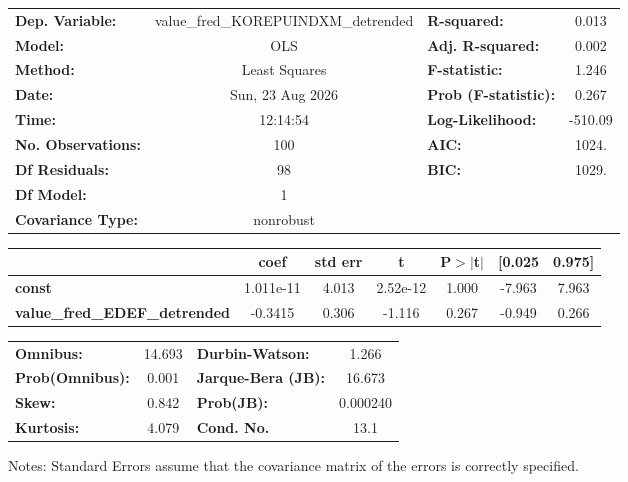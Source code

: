 \begin{center}
\begin{tabular}{lclc}
\toprule
\textbf{Dep. Variable:}               & value\_fred\_KOREPUINDXM\_detrended & \textbf{  R-squared:         } &     0.013   \\
\textbf{Model:}                       &                 OLS                 & \textbf{  Adj. R-squared:    } &     0.002   \\
\textbf{Method:}                      &            Least Squares            & \textbf{  F-statistic:       } &     1.246   \\
\textbf{Date:}                        &           Sun, 23 Aug 2026          & \textbf{  Prob (F-statistic):} &    0.267    \\
\textbf{Time:}                        &               12:14:54              & \textbf{  Log-Likelihood:    } &   -510.09   \\
\textbf{No. Observations:}            &                   100               & \textbf{  AIC:               } &     1024.   \\
\textbf{Df Residuals:}                &                    98               & \textbf{  BIC:               } &     1029.   \\
\textbf{Df Model:}                    &                     1               & \textbf{                     } &             \\
\textbf{Covariance Type:}             &              nonrobust              & \textbf{                     } &             \\
\bottomrule
\end{tabular}
\begin{tabular}{lcccccc}
                                      & \textbf{coef} & \textbf{std err} & \textbf{t} & \textbf{P$> |$t$|$} & \textbf{[0.025} & \textbf{0.975]}  \\
\midrule
\textbf{const}                        &    1.011e-11  &        4.013     &  2.52e-12  &         1.000        &       -7.963    &        7.963     \\
\textbf{value\_fred\_EDEF\_detrended} &      -0.3415  &        0.306     &    -1.116  &         0.267        &       -0.949    &        0.266     \\
\bottomrule
\end{tabular}
\begin{tabular}{lclc}
\textbf{Omnibus:}       & 14.693 & \textbf{  Durbin-Watson:     } &    1.266  \\
\textbf{Prob(Omnibus):} &  0.001 & \textbf{  Jarque-Bera (JB):  } &   16.673  \\
\textbf{Skew:}          &  0.842 & \textbf{  Prob(JB):          } & 0.000240  \\
\textbf{Kurtosis:}      &  4.079 & \textbf{  Cond. No.          } &     13.1  \\
\bottomrule
\end{tabular}
\end{center}

Notes: \newline
 [1] Standard Errors assume that the covariance matrix of the errors is correctly specified.